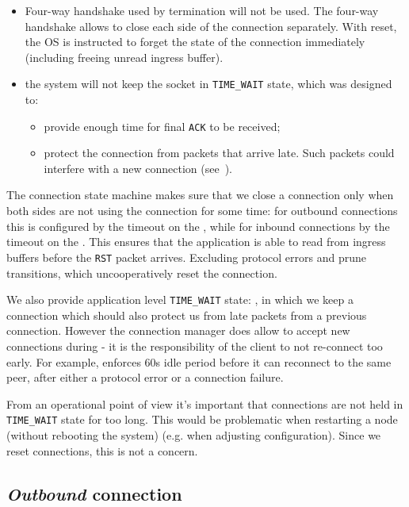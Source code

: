 \begin{itemize}
  \item Four-way handshake used by \TCP{} termination will not be used. The
    four-way handshake allows to close each side of the connection separately.
    With reset, the OS is instructed to forget the state of the connection
    immediately (including freeing unread ingress buffer).
  \item the system will not keep the socket in \texttt{TIME\_WAIT} state, which
    was designed to:
    \begin{itemize}
      \item provide enough time for final \texttt{ACK} to be received;
      \item protect the connection from packets that arrive late. Such
        packets could interfere with a new connection
        (see~\cite{stevens2003unix}).
    \end{itemize}
\end{itemize}

The connection state machine makes sure that we close a connection only when
both sides are not using the connection for some time: for outbound connections
this is configured by the timeout on the \OutboundIdleStateAny{}, while for
inbound connections by the timeout on the \InboundIdleStateAny{}.
This ensures that the application is able to read from ingress buffers
before the \texttt{RST} packet arrives.  Excluding protocol errors and prune
transitions, which uncooperatively reset the connection.

We also provide application level \texttt{TIME\_WAIT} state:
\TerminatingState{}, in which we keep a connection which should also protect us
from late packets from a previous connection. However the connection manager
does allow to accept new connections during \TerminatingState{} - it is
the responsibility of the client to not re-connect too early. For example,
\ptopgov{} enforces 60s idle period before it can reconnect to the same peer, after
either a protocol error or a connection failure.

From an operational point of view it's important that connections are not held in
\texttt{TIME\_WAIT} state for too long. This would be problematic when
restarting a node (without rebooting the system) (e.g. when adjusting
configuration). Since we reset connections, this is not a concern.


\subsection{\textit{Outbound} connection}

